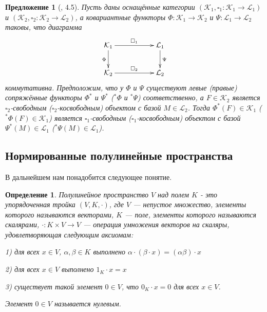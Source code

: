 \documentclass[12pt]{article}
\newtheorem{proposition}[theorem]{Предложение}
\newtheorem{definition}[theorem]{Определение}
\begin{document}
\begin{proposition}[\cite{HelMetrFrQmod}, 4.5]\label{PrFunctorMapFrToFr} Пусть даны оснащённые категории $(\mathcal{K}_1, \square_1: \mathcal{K}_1 \to \mathcal{L}_1)$ и $(\mathcal{K}_2, \square_2 : \mathcal{K}_2 \to \mathcal{L}_2)$,
а ковариантные функторы $\Phi : \mathcal{K}_1 \to \mathcal{K}_2$ и $\Psi : \mathcal{L}_1 \to \mathcal{L}_2$ таковы, что диаграмма
$$
\xymatrix{
{\mathcal{K}_1}\ar[d]_{\Phi}
\ar[rr]^{\square_1} & & {\mathcal{L}_1}\ar[d]^{\Psi}\\
{\mathcal{K}_2}\ar[rr]^{\square_2} & & {\mathcal{L}_2}}
$$
коммутативна. Предположим, что у $\Phi$ и $\Psi$ существуют левые (правые) сопряжённые функторы $\Phi^*$ и $\Psi^*$ (${}^*\Phi$ и ${}^*\Psi$) соответственно, а $F\in\mathcal{K}_2$ является 
$\square_2$-свободным ($\square_2$-косвободным) объектом с базой $M\in\mathcal{L}_2$.
Тогда $\Phi^*(F)\in\mathcal{K}_1$ (${}^*\Phi(F)\in\mathcal{K}_1$) является $\square_1$-свободным ($\square_1$-косвободным) объектом с базой $\Psi^*(M)\in\mathcal{L}_1$ (${}^*\Psi(M)\in\mathcal{L}_1$). 
\end{proposition}
























\subsection{Нормированные полулинейные пространства}

В дальнейшем нам понадобится следующее понятие.

\begin{definition}\label{DefSemiLinSp} Полулинейное пространство $V$ над полем $K$ - это упорядоченная тройка $(V, K, \cdot)$, где $V$ --- непустое множество, элементы которого называются векторами, $K$ --- поле, элементы которого называются скалярами, $\cdot : K \times V \to V$ --- операция умножения векторов на скаляры, удовлетворяющая следующим аксиомам:

1) для всех $x\in V$, $\alpha,\beta\in K$ выполнено $\alpha \cdot (\beta \cdot x) = (\alpha \beta) \cdot x $

2) для всех $x\in V$ выполнено $1_K \cdot x = x$

3) существует такой элемент $0 \in V$, что $0_K \cdot x = 0$ для всех $x\in V$.

Элемент $0\in V$ называется нулевым.
\end{definition}
\end{document}
